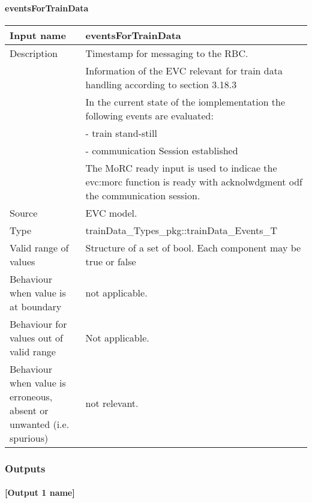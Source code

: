 \paragraph{eventsForTrainData}

\begin{longtable}{p{}p{}}
\toprule
Input name				& eventsForTrainData\\
\midrule
Description				& Timestamp for messaging to the RBC.\\
&
Information of the EVC relevant for train data handling according to section 3.18.3\\
&
In the current state of the iomplementation the following events are evaluated:\\
&
- train stand-still\\
&
- communication Session established\\
&
The MoRC ready input is used to indicae the evc:morc function is ready with acknolwdgment odf the communication session.\\

\midrule
Source					& EVC model.\\ 
\midrule
Type					& trainData\_Types\_pkg::trainData\_Events\_T\\
\midrule
Valid range of values	& Structure of a set of bool. Each component may be true or false\\
\midrule
Behaviour when value is at boundary	& not applicable.\\
\midrule
Behaviour for values out of valid range	& Not applicable.\\
\midrule
Behaviour when value is erroneous, absent or unwanted (i.e. spurious) & not relevant.\\

\bottomrule
\end{longtable}

\subsubsection{Outputs}\label{s:traindata_outputs}

\paragraph{[Output 1 name]}

